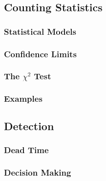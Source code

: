 \subsection{Counting Statistics}
\subsubsection{Statistical Models}

\subsubsection{Confidence Limits}
\subsubsection{The \texorpdfstring{$\chi^2$}{Chi-squared} Test}
\subsubsection{Examples}
\subsection{Detection}
\subsubsection{Dead Time}
\subsubsection{Decision Making}